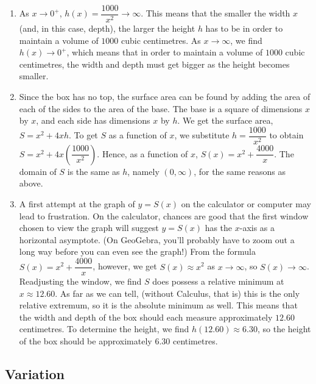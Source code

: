{\begin{enumerate}
\item As $x \rightarrow 0^{+}$, $h(x) = \dfrac{1000}{x^2} \rightarrow \infty$.  This means that the smaller the width $x$  (and, in this case, depth), the larger the height $h$ has to be in order to maintain a volume of $1000$ cubic centimetres. As $x \rightarrow \infty$, we find $h(x) \rightarrow 0^{+}$, which means that in order to maintain a volume of $1000$ cubic centimetres, the width and depth must get bigger as the height becomes smaller.

\item  Since the box has no top, the surface area can be found by adding the area of each of the sides to the area of the base.  The base is a square of dimensions $x$ by $x$, and each side has dimensions $x$ by $h$.  We get the surface area, $S = x^2+4xh$.  To get $S$ as a function of $x$, we substitute $h = \dfrac{1000}{x^2}$ to obtain $S = x^2+4x \left( \dfrac{1000}{x^2}\right)$.  Hence, as a function of $x$, $S(x) = x^2 + \dfrac{4000}{x}$.  The domain of $S$ is the same as $h$, namely $(0, \infty)$, for the same reasons as above.

\item   A first attempt at the graph of $y=S(x)$ on the calculator or computer may lead to frustration.  On the calculator, chances are good that the first window chosen to view the graph will suggest $y=S(x)$ has the $x$-axis as a horizontal asymptote. (On GeoGebra, you'll probably have to zoom out a long way before you can even see the graph!)  From the formula $S(x) = x^2 + \dfrac{4000}{x}$, however, we get $S(x) \approx x^2$ as $x \rightarrow \infty$, so $S(x) \rightarrow \infty$.  Readjusting the window, we find $S$ does possess a relative minimum at $x \approx 12.60$.  As far as we can tell, (without Calculus, that is) this is the only relative extremum, so it is the absolute minimum as well. This means that the width and depth of the box should each measure approximately $12.60$ centimetres.  To determine the height, we find $h(12.60) \approx 6.30$, so the height of the box should be approximately $6.30$ centimetres.


\end{enumerate}
}

\medskip

\subsection{Variation}
\label{Variation}

